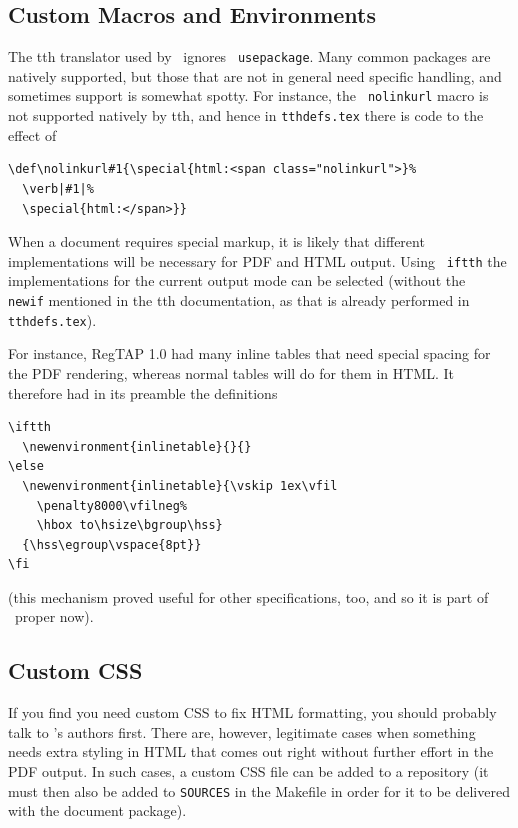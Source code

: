 \documentclass[11pt,a4paper]{ivoa}
\newcommand{\texword}[1]{\texttt{\color{texcolor} #1}}
\begin{document}
\subsection{Custom Macros and Environments}

The tth translator used by \ivoatex\ ignores \texword{usepackage}.  Many
common packages are natively supported, but those that are not in
general need specific handling, and sometimes support is somewhat spotty.  
For instance, the \texword{nolinkurl}
macro is not supported natively by tth, and hence in
\texttt{tthdefs.tex} there is code to the effect of
\begin{lstlisting}[basicstyle=\footnotesize]
\def\nolinkurl#1{\special{html:<span class="nolinkurl">}%
  \verb|#1|%
  \special{html:</span>}}
\end{lstlisting}

When a document requires special markup, it is likely that 
different implementations will be necessary for PDF and HTML output.
Using \texword{iftth} the implementations for the current output mode
can be selected (without the \texword{newif} mentioned in the tth
documentation, as that is already performed in \texttt{tthdefs.tex}).

For instance, RegTAP 1.0 had many inline tables that need special spacing
for the PDF rendering, whereas normal tables will do for them
in HTML.  It therefore
had in its preamble the definitions
\begin{lstlisting}
\iftth
  \newenvironment{inlinetable}{}{}
\else
  \newenvironment{inlinetable}{\vskip 1ex\vfil
    \penalty8000\vfilneg%
    \hbox to\hsize\bgroup\hss}
  {\hss\egroup\vspace{8pt}}
\fi
\end{lstlisting}

(this mechanism proved useful for other specifications, too, and so
it is part of \ivoatex~proper now).

\subsection{Custom CSS}
\label{sect:customcss}

If you find you need custom CSS to fix HTML formatting, you should
probably talk to \ivoatex's authors first.  There are, however, 
legitimate cases when something needs extra styling in HTML that 
comes out right without further effort
in the PDF output.  In such cases, a custom CSS file can
be added to a repository (it must then also be added to \texttt{SOURCES}
in the Makefile in order for it to be delivered with the document
package).
\end{document}
